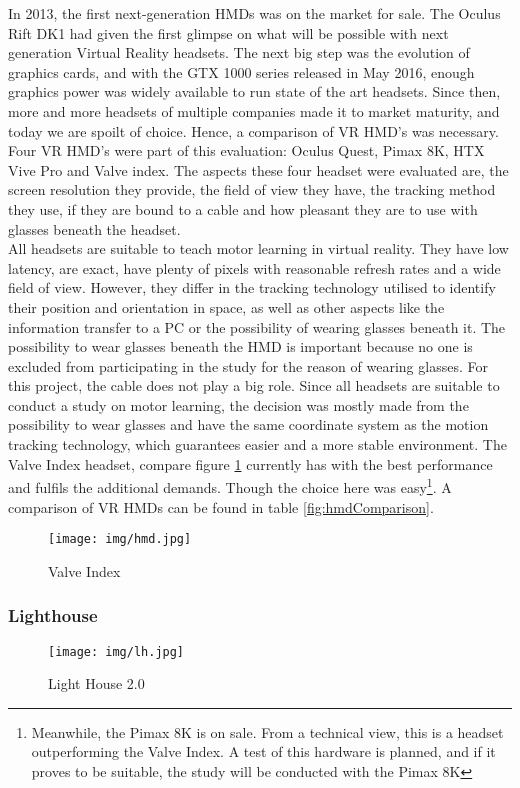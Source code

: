 In 2013, the first next-generation HMDs was on the market for sale. The Oculus Rift DK1 had given the first glimpse on what will be possible with next generation Virtual Reality headsets. The next big step was the evolution of graphics cards, and with the GTX 1000 series released in May 2016, enough graphics power was widely available to run state of the art headsets. Since then, more and more headsets of multiple companies made it to market maturity, and today we are spoilt of choice. Hence, a comparison of VR HMD's was necessary. Four VR HMD's were part of this evaluation: Oculus Quest, Pimax 8K, HTX Vive Pro and Valve index. The aspects these four headset were evaluated are, the screen resolution they provide, the field of view they have, the tracking method they use, if they are bound to a cable and how pleasant they are to use with glasses beneath the headset.\\
All headsets are suitable to teach motor learning in virtual reality. They have low latency, are exact, have plenty of pixels with reasonable refresh rates and a wide field of view. However, they differ in the tracking technology utilised to identify their position and orientation in space, as well as other aspects like the information transfer to a PC or the possibility of wearing glasses beneath it. The possibility to wear glasses beneath the HMD is important because no one is excluded from participating in the study for the reason of wearing glasses. For this project, the cable does not play a big role. Since all headsets are suitable to conduct a study on motor learning, the decision was mostly made from the possibility to wear glasses and have the same coordinate system as the motion tracking technology, which guarantees easier and a more stable environment. The Valve Index headset, compare figure \ref{fig:hmd} currently has with the best performance and fulfils the additional demands. Though the choice here was easy\footnote{Meanwhile, the Pimax 8K is on sale. From a technical view, this is a headset outperforming the Valve Index. A test of this hardware is planned, and if it proves to be suitable, the study will be conducted with the Pimax 8K}. A comparison of VR HMDs can be found in table \ref{fig:hmdComparison}.
\begin{figure}
	\centering
	\texttt{[image: img/hmd.jpg]}
	\caption{Valve Index}
	\label{fig:hmd}
\end{figure}


\subsubsection{Lighthouse}
\begin{figure}
	\centering
	\texttt{[image: img/lh.jpg]}
	\caption{Light House 2.0}
	\label{fig:lh}
\end{figure}

